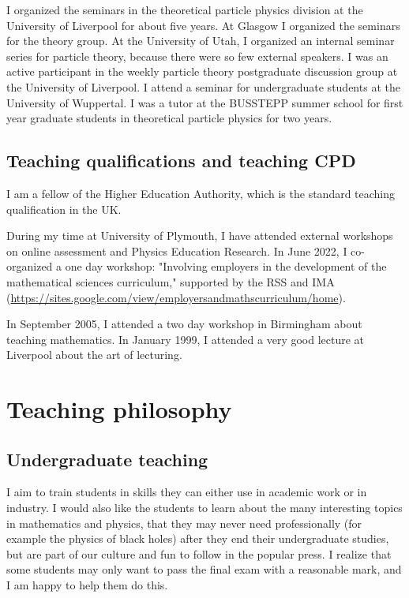 \documentclass[12pt]{article}
\begin{document}
I organized the seminars in the theoretical particle physics division
at the University of Liverpool for about five years. At Glasgow I
organized the seminars for the theory group.  At the University of
Utah, I organized an internal seminar series for particle theory,
because there were so few external speakers.
I was an active
participant in the weekly particle theory postgraduate discussion
group at the University of Liverpool.
I attend a seminar for undergraduate students at the University
of Wuppertal.
I was a tutor at the BUSSTEPP summer school for first year
graduate students in theoretical particle physics for two years.



\subsection{Teaching qualifications and teaching CPD}

I am a fellow of the Higher Education Authority, which is the standard
teaching qualification in the UK.

During my time at University of Plymouth, I have attended external
workshops on online assessment and Physics Education Research.  In
June 2022, I co-organized a one day workshop: 
"Involving employers in the development of the mathematical sciences
curriculum," supported by the RSS and IMA (\url{https://sites.google.com/view/employersandmathscurriculum/home}).

 In
September 2005, I attended a two day workshop in Birmingham about
teaching mathematics. In January 1999, I attended a very good lecture
at Liverpool about the art of lecturing.


\section{Teaching philosophy} 

\subsection{Undergraduate teaching}

I aim to train students in skills they
can either use in academic work or in
industry. I would also like the students to
learn about the many interesting 
topics in mathematics and physics, that they may never 
need professionally (for example the physics of black holes)
after they end their undergraduate
studies, but are part of our culture and fun
to follow in the popular press.
I realize that some students may only want
to pass the final exam with a reasonable mark,
and I am happy to help them do this.
\end{document}
